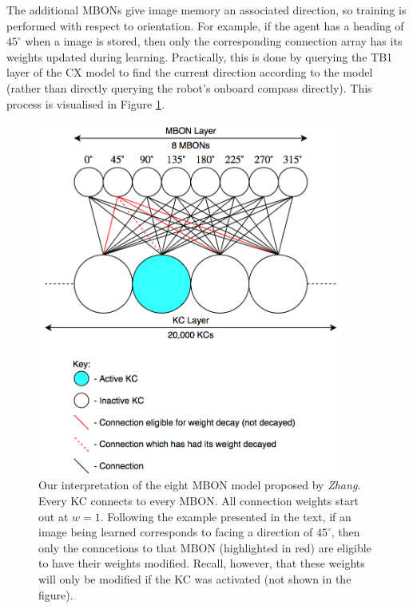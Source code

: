 \documentclass[a4paper,11pt,twoside,openright]{article}
\begin{document}
The additional MBONs give image memory an associated direction, so
training is performed with respect to orientation. For example, if the
agent has a heading of $45^{\circ}$ when a image is stored, then only
the corresponding connection array has its weights updated during
learning. Practically, this is done by querying the TB1 layer of the
CX model to find the current direction according to the model (rather
than directly querying the robot's onboard compass directly). This
process is visualised in Figure \ref{fig:eightmbon}.
\newline
\par

\begin{figure}[h!]
  \centering
  \includegraphics[width=0.9\textwidth]{EightENModel}
  \caption{\label{fig:eightmbon} Our interpretation of the eight MBON model
    proposed by \textit{Zhang}. Every KC connects to every MBON. All connection
    weights start out at $w=1$. Following the example presented in the text,
    if an image being learned corresponds to facing a direction of $45^{\circ}$,
    then only the conncetions to that MBON (highlighted in red) are eligible to
    have their weights modified. Recall, however, that these weights will only
    be modified if the KC was activated (not shown in the figure).
    }
\end{figure}
\end{document}
